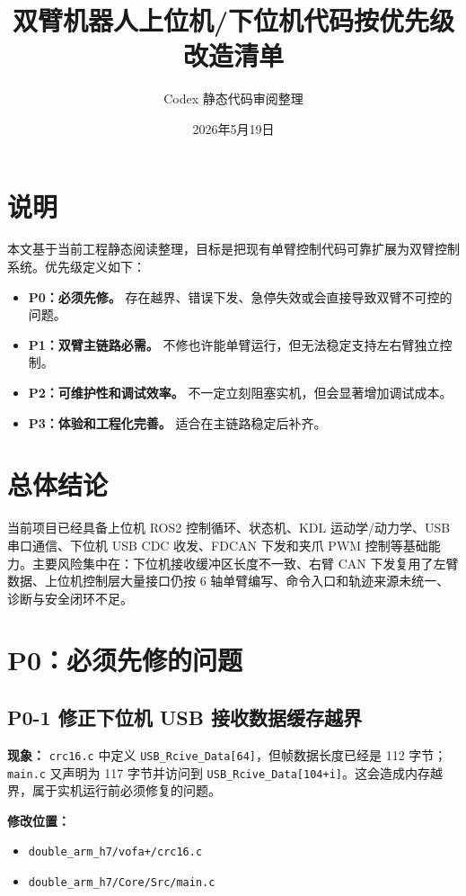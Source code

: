 \documentclass[UTF8,a4paper,11pt]{ctexart}
\title{双臂机器人上位机/下位机代码按优先级改造清单}
\author{Codex 静态代码审阅整理}
\date{2026年5月19日}
\begin{document}
\maketitle

\section*{说明}

本文基于当前工程静态阅读整理，目标是把现有单臂控制代码可靠扩展为双臂控制系统。优先级定义如下：

\begin{itemize}[leftmargin=2em]
  \item \textbf{P0：必须先修。} 存在越界、错误下发、急停失效或会直接导致双臂不可控的问题。
  \item \textbf{P1：双臂主链路必需。} 不修也许能单臂运行，但无法稳定支持左右臂独立控制。
  \item \textbf{P2：可维护性和调试效率。} 不一定立刻阻塞实机，但会显著增加调试成本。
  \item \textbf{P3：体验和工程化完善。} 适合在主链路稳定后补齐。
\end{itemize}

\section{总体结论}

当前项目已经具备上位机 ROS2 控制循环、状态机、KDL 运动学/动力学、USB 串口通信、下位机 USB CDC 收发、FDCAN 下发和夹爪 PWM 控制等基础能力。主要风险集中在：下位机接收缓冲区长度不一致、右臂 CAN 下发复用了左臂数据、上位机控制层大量接口仍按 6 轴单臂编写、命令入口和轨迹来源未统一、诊断与安全闭环不足。

\section{P0：必须先修的问题}

\subsection{P0-1 修正下位机 USB 接收数据缓存越界}

\textbf{现象：} \verb|crc16.c| 中定义 \verb|USB_Rcive_Data[64]|，但帧数据长度已经是 112 字节；\verb|main.c| 又声明为 117 字节并访问到 \verb|USB_Rcive_Data[104+i]|。这会造成内存越界，属于实机运行前必须修复的问题。

\textbf{修改位置：}
\begin{itemize}[leftmargin=2em]
  \item \verb|double_arm_h7/vofa+/crc16.c|
  \item \verb|double_arm_h7/Core/Src/main.c|
\end{itemize}
\end{document}
